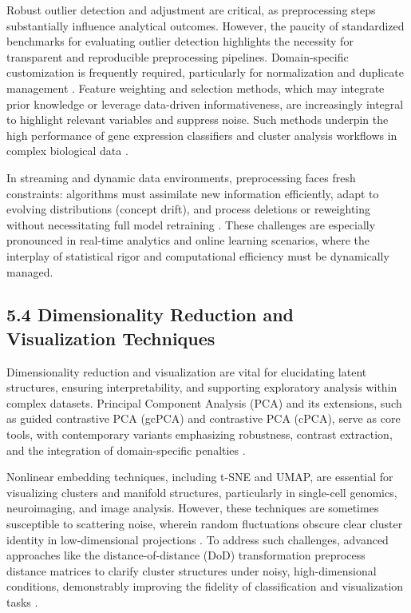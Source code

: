 \documentclass[11pt]{article}
\begin{document}
Robust outlier detection and adjustment are critical, as preprocessing steps substantially influence analytical outcomes. However, the paucity of standardized benchmarks for evaluating outlier detection highlights the necessity for transparent and reproducible preprocessing pipelines. Domain-specific customization is frequently required, particularly for normalization and duplicate management \cite{ref73,ref74,ref76,ref77,ref78,ref92,ref95}. Feature weighting and selection methods, which may integrate prior knowledge or leverage data-driven informativeness, are increasingly integral to highlight relevant variables and suppress noise. Such methods underpin the high performance of gene expression classifiers and cluster analysis workflows in complex biological data \cite{ref116}.

In streaming and dynamic data environments, preprocessing faces fresh constraints: algorithms must assimilate new information efficiently, adapt to evolving distributions (concept drift), and process deletions or reweighting without necessitating full model retraining \cite{ref76,ref79,ref80,ref86,ref94}. These challenges are especially pronounced in real-time analytics and online learning scenarios, where the interplay of statistical rigor and computational efficiency must be dynamically managed.

\subsection{5.4 Dimensionality Reduction and Visualization Techniques}

Dimensionality reduction and visualization are vital for elucidating latent structures, ensuring interpretability, and supporting exploratory analysis within complex datasets. Principal Component Analysis (PCA) and its extensions, such as guided contrastive PCA (gcPCA) and contrastive PCA (cPCA), serve as core tools, with contemporary variants emphasizing robustness, contrast extraction, and the integration of domain-specific penalties \cite{ref97,ref99}.

Nonlinear embedding techniques, including t-SNE and UMAP, are essential for visualizing clusters and manifold structures, particularly in single-cell genomics, neuroimaging, and image analysis. However, these techniques are sometimes susceptible to scattering noise, wherein random fluctuations obscure clear cluster identity in low-dimensional projections \cite{ref99}. To address such challenges, advanced approaches like the distance-of-distance (DoD) transformation preprocess distance matrices to clarify cluster structures under noisy, high-dimensional conditions, demonstrably improving the fidelity of classification and visualization tasks \cite{ref99}.
\end{document}
